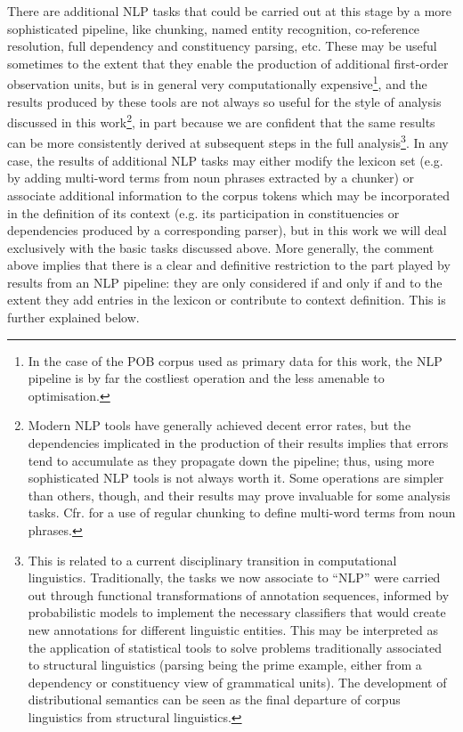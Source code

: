 There are additional NLP tasks that could be carried out at this stage by a more sophisticated pipeline, like chunking, named entity recognition, co-reference resolution, full dependency and constituency parsing, etc.
These may be useful sometimes to the extent that they enable the production of additional first-order observation units, but is in general very computationally expensive\footnote{
    In the case of the POB corpus used as primary data for this work, the NLP pipeline is by far the costliest operation and the less amenable to optimisation.
}, and the results produced by these tools are not always so useful for the style of analysis discussed in this work\footnote{
    Modern NLP tools have generally achieved decent error rates, but the dependencies implicated in the production of their results implies that errors tend to accumulate as they propagate down the pipeline; thus, using more sophisticated NLP tools is not always worth it.
    Some operations are simpler than others, though, and their results may prove invaluable for some analysis tasks.
    Cfr. \cite{rule2015} for a use of regular chunking to define multi-word terms from noun phrases.
}, in part because we are confident that the same results can be more consistently derived at subsequent steps in the full analysis\footnote{
    This is related to a current disciplinary transition in computational linguistics.
    Traditionally, the tasks we now associate to ``NLP'' were carried out through functional transformations of annotation sequences, informed by probabilistic models to implement the necessary classifiers that would create new annotations for different linguistic entities.
    This may be interpreted as the application of statistical tools to solve problems traditionally associated to structural linguistics (parsing being the prime example, either from a dependency or constituency view of grammatical units).
    The development of distributional semantics can be seen as the final departure of corpus linguistics from structural linguistics.
}.
In any case, the results of additional NLP tasks may either modify the lexicon set (e.g. by adding multi-word terms from noun phrases extracted by a chunker) or associate additional information to the corpus tokens which may be incorporated in the definition of its context (e.g. its participation in constituencies or dependencies produced by a corresponding parser), but in this work we will deal exclusively with the basic tasks discussed above.
More generally, the comment above implies that there is a clear and definitive restriction to the part played by results from an NLP pipeline: they are only considered if and only if and to the extent they add entries in the lexicon or contribute to context definition.
This is further explained below. %

